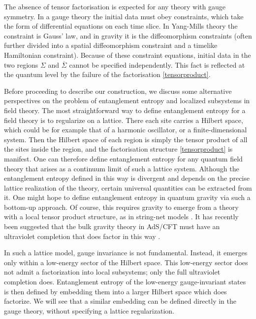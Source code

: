 \documentclass[a4paper,11pt]{article}
\begin{document}
The absence of tensor factorisation is expected for any theory with gauge symmetry.
In a gauge theory the initial data must obey constraints, which take the form of differential equations on each time slice.
In Yang-Mills theory the constraint is Gauss' law, and in gravity it is the diffeomorphism constraints (often further divided into a spatial diffeomorphism constraint and a timelike Hamiltonian constraint).
Because of these constraint equations, initial data in the two regions $\Sigma$ and $\overline \Sigma$ cannot be specified independently.
This fact is reflected at the quantum level by the failure of the factorisation \eqref{tensorproduct}.

Before proceeding to describe our construction, we discuss some alternative perspectives on the problem of entanglement entropy and localized subsystems in field theory.
The most straightforward way to define entanglement entropy for a field theory is to regularize on a lattice. 
There each site carries a Hilbert space, which could be for example that of a harmonic oscillator, or a finite-dimensional system.
Then the Hilbert space of each region is simply the tensor product of all the sites inside the region, and the factorisation structure \eqref{tensorproduct} is manifest.
One can therefore define entanglement entropy for any quantum field theory that arises as a continuum limit of such a lattice system.
Although the entanglement entropy defined in this way is divergent and depends on the precise lattice realization of the theory, certain universal quantities can be extracted from it.
One might hope to define entanglement entropy in quantum gravity via such a bottom-up approach.
Of course, this requires gravity to emerge from a theory with a local tensor product structure, as in string-net models \cite{Gu:2009jh}.
It has recently been suggested that the bulk gravity theory in AdS/CFT must have an ultraviolet completion that does factor in this way \cite{Harlow:2015lma}.

In such a lattice model, gauge invariance is not fundamental.
Instead, it emerges only within a low-energy sector of the Hilbert space.
This low-energy sector does not admit a factorization into local subsystems; only the full ultraviolet completion does.
Entanglement entropy of the low-energy gauge-invariant states is then defined by embedding them into a larger Hilbert space which does factorize.
We will see that a similar embedding can be defined directly in the gauge theory, without specifying a lattice regularization.
\end{document}
